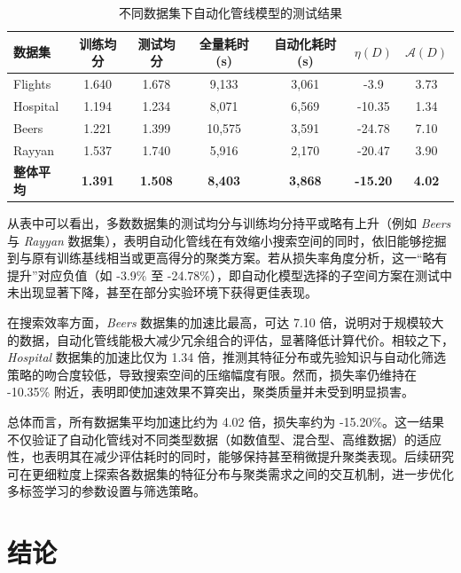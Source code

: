 \documentclass[10pt]{article} %
\numberwithin{equation}{section}
\begin{document}
\begin{table}[htbp]
\centering
\small
\setlength{\tabcolsep}{6pt}
\renewcommand{\arraystretch}{1.1}
\begin{tabular}{lcccccc}
\toprule
\textbf{数据集} & \textbf{训练均分} & \textbf{测试均分} & \textbf{全量耗时 (s)} & \textbf{自动化耗时 (s)} & \textbf{\(\eta(D)\)} & \textbf{\(\mathcal{A}(D)\)} \\
\midrule
Flights  & 1.640  & 1.678  & 9,133  & 3,061  & -3.9  & 3.73 \\
Hospital & 1.194  & 1.234  & 8,071  & 6,569  & -10.35 & 1.34 \\
Beers    & 1.221  & 1.399  & 10,575 & 3,591  & -24.78 & 7.10 \\
Rayyan   & 1.537  & 1.740  & 5,916  & 2,170  & -20.47 & 3.90 \\
\midrule
\textbf{整体平均} & \textbf{1.391}  & \textbf{1.508}  & \textbf{8,403}  & \textbf{3,868}  & \textbf{-15.20}  & \textbf{4.02} \\
\bottomrule
\end{tabular}
\caption{不同数据集下自动化管线模型的测试结果}
\label{tab:autoML_res_new}
\end{table}

从表中可以看出，多数数据集的测试均分与训练均分持平或略有上升（例如 \textit{Beers} 与 \textit{Rayyan} 数据集），表明自动化管线在有效缩小搜索空间的同时，依旧能够挖掘到与原有训练基线相当或更高得分的聚类方案。若从损失率角度分析，这一“略有提升”对应负值（如 -3.9\% 至 -24.78\%），即自动化模型选择的子空间方案在测试中未出现显著下降，甚至在部分实验环境下获得更佳表现。

在搜索效率方面，\textit{Beers} 数据集的加速比最高，可达 7.10 倍，说明对于规模较大的数据，自动化管线能极大减少冗余组合的评估，显著降低计算代价。相较之下，\textit{Hospital} 数据集的加速比仅为 1.34 倍，推测其特征分布或先验知识与自动化筛选策略的吻合度较低，导致搜索空间的压缩幅度有限。然而，损失率仍维持在 -10.35\% 附近，表明即使加速效果不算突出，聚类质量并未受到明显损害。

总体而言，所有数据集平均加速比约为 4.02 倍，损失率约为 -15.20\%。这一结果不仅验证了自动化管线对不同类型数据（如数值型、混合型、高维数据）的适应性，也表明其在减少评估耗时的同时，能够保持甚至稍微提升聚类表现。后续研究可在更细粒度上探索各数据集的特征分布与聚类需求之间的交互机制，进一步优化多标签学习的参数设置与筛选策略。


\section{结论}
\label{sec:conclusion}
\end{document}
